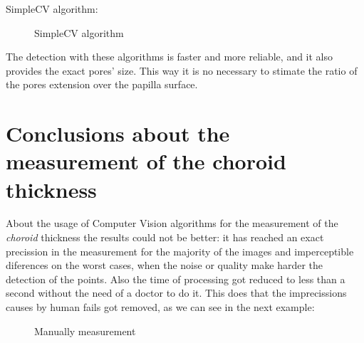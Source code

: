 SimpleCV algorithm:

    \begin{figure}[H]
      \caption{SimpleCV algorithm}
      \centering \setlength\fboxsep{0pt} \setlength\fboxrule{0.5pt}
    \end{figure}

The detection with these algorithms is faster and more reliable, and it
also provides the exact pores' size. This way it is no necessary to
stimate the ratio of the pores extension over the papilla surface.


\section{Conclusions about the measurement of the choroid thickness}
About the usage of Computer Vision algorithms for the measurement of
the \emph{choroid} thickness the results could not be better:
it has reached an exact precission in the measurement for the majority
of the images and imperceptible diferences on the worst cases, when
the noise or quality make harder the detection of the points.
Also the time of processing got reduced to less than a second without
the need of a doctor to do it. This does that the imprecissions
causes by human fails got removed, as we can see in the next example:

    \begin{figure}[H]
      \caption{Manually measurement}
      \centering \setlength\fboxsep{0pt} \setlength\fboxrule{0.5pt}
    \end{figure}

